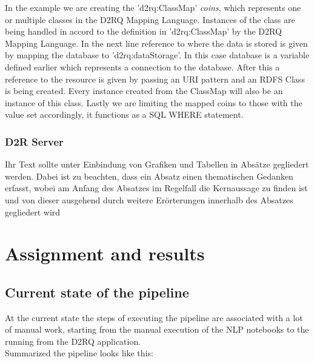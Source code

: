 \documentclass[12pt, oneside]{article}
\begin{document}
In the example we are creating the 'd2rq:ClassMap' \textit{coins}, which represents one or multiple classes in the D2RQ Mapping Language. Instances of the class are being handled in accord to the definition in 'd2rq:ClassMap' by the D2RQ Mapping Language. In the next line reference to where the data is stored is given by mapping the database to 'd2rq:dataStorage'. In this case database is a variable defined earlier which represents a connection to the database. After this a reference to the resource is given by passing an URI pattern and an RDFS Class is being created. Every instance created from the ClassMap will also be an instance of this class. Lastly we are limiting the mapped coins to those with the value set accordingly, it functions as a SQL WHERE statement.
\subsubsection{D2R Server}
Ihr Text sollte unter Einbindung von Grafiken und Tabellen in Absätze gegliedert werden. Dabei ist zu beachten, dass ein Absatz einen thematischen Gedanken erfasst, wobei am Anfang des Absatzes im Regelfall die Kernaussage zu finden ist und von dieser ausgehend durch weitere Erörterungen innerhalb des Absatzes gegliedert wird

\newpage

\section{Assignment and results}
\subsection{Current state of the pipeline}
At the current state the steps of executing the pipeline are associated with a lot of manual work, starting from the manual execution of the NLP notebooks to the running from the D2RQ application.\\ Summarized the pipeline looks like this:\\
\begin{center}
\end{center}
\end{document}
